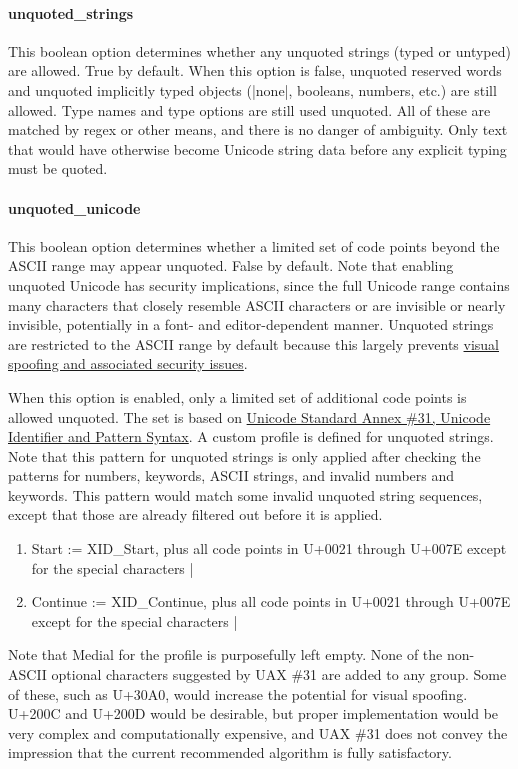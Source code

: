 \documentclass[11pt]{article}
\begin{document}
{{\paragraph{unquoted\_strings}
This boolean option determines whether any unquoted strings (typed or untyped) are allowed.  True by default.  When this option is false, unquoted reserved words and unquoted implicitly typed objects (|none|, booleans, numbers, etc.) are still allowed.  Type names and type options are still used unquoted.  All of these are matched by regex or other means, and there is no danger of ambiguity.  Only text that would have otherwise become Unicode string data before any explicit typing must be quoted.

\paragraph{unquoted\_unicode}
This boolean option determines whether a limited set of code points beyond the ASCII range may appear unquoted.  False by default.  Note that enabling unquoted Unicode has security implications, since the full Unicode range contains many characters that closely resemble ASCII characters or are invisible or nearly invisible, potentially in a font- and editor-dependent manner.  Unquoted strings are restricted to the ASCII range by default because this largely prevents \href{http://unicode.org/reports/tr36/}{visual spoofing and associated security issues}.

When this option is enabled, only a limited set of additional code points is allowed unquoted.  The set is based on \href{http://unicode.org/reports/tr31/}{Unicode Standard Annex \#31, Unicode Identifier and Pattern Syntax}.  A custom profile is defined for unquoted strings.  Note that this pattern for unquoted strings is only applied after checking the patterns for numbers, keywords, ASCII strings, and invalid numbers and keywords.  This pattern would match some invalid unquoted string sequences, except that those are already filtered out before it is applied.
\begin{enumerate}
\item Start := XID\_Start, plus all code points in U+0021 through U+007E except for the special characters |%
\item Continue := XID\_Continue, plus all code points in U+0021 through U+007E except for the special characters |%
\end{enumerate}
Note that Medial for the profile is purposefully left empty.  None of the non-ASCII optional characters suggested by UAX \#31 are added to any group.  Some of these, such as U+30A0, would increase the potential for visual spoofing.  U+200C and U+200D would be desirable, but proper implementation would be very complex and computationally expensive, and UAX \#31 does not convey the impression that the current recommended algorithm is fully satisfactory.



}}
\end{document}
